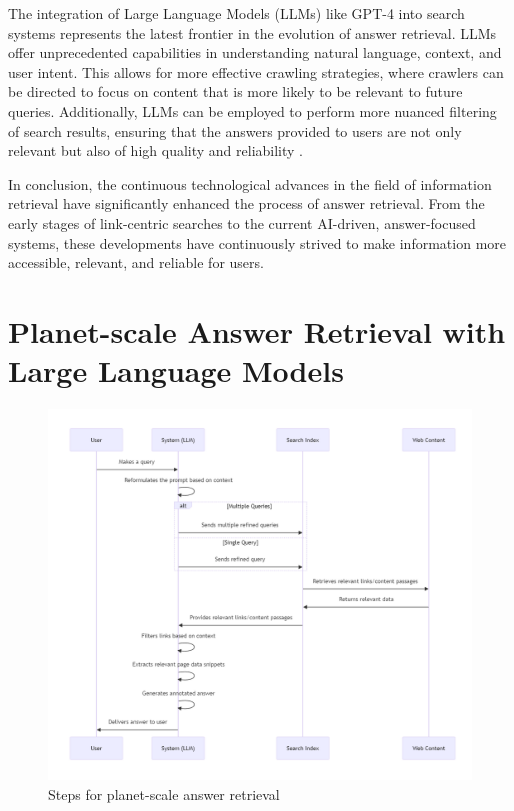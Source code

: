 \documentclass{article}
\begin{document}
The integration of Large Language Models (LLMs) like GPT-4 into search systems represents the latest frontier in the evolution of answer retrieval. LLMs offer unprecedented capabilities in understanding natural language, context, and user intent. This allows for more effective crawling strategies, where crawlers can be directed to focus on content that is more likely to be relevant to future queries. Additionally, LLMs can be employed to perform more nuanced filtering of search results, ensuring that the answers provided to users are not only relevant but also of high quality and reliability \citep{brown2020language}.

In conclusion, the continuous technological advances in the field of information retrieval have significantly enhanced the process of answer retrieval. From the early stages of link-centric searches to the current AI-driven, answer-focused systems, these developments have continuously strived to make information more accessible, relevant, and reliable for users.

\section{Planet-scale Answer Retrieval with Large Language Models}

\begin{figure}[h]
    \centering
    \includegraphics[width=1\linewidth]{ir_3.png}
    \caption{Steps for planet-scale answer retrieval}
    \label{fig:planet-answer-retrieval}
\end{figure}
\end{document}
